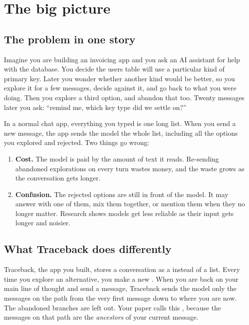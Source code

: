 \chapter{The big picture}

\section{The problem in one story}

Imagine you are building an invoicing app and you ask an AI assistant for help with the database. You decide the users table will use a particular kind of primary key. Later you wonder whether another kind would be better, so you explore it for a few messages, decide against it, and go back to what you were doing. Then you explore a third option, and abandon that too. Twenty messages later you ask: ``remind me, which key type did we settle on?''

In a normal chat app, everything you typed is one long list. When you send a new message, the app sends the model the whole list, including all the options you explored and rejected. Two things go wrong:

\begin{enumerate}
\item \textbf{Cost.} The model is paid by the amount of text it reads. Re-sending abandoned explorations on every turn wastes money, and the waste grows as the conversation gets longer.
\item \textbf{Confusion.} The rejected options are still in front of the model. It may answer with one of them, mix them together, or mention them when they no longer matter. Research shows models get less reliable as their input gets longer and noisier.
\end{enumerate}

\section{What Traceback does differently}

Traceback, the app you built, stores a conversation as a  instead of a list. Every time you explore an alternative, you make a new . When you are back on your main line of thought and send a message, Traceback sends the model only the messages on the path from the very first message down to where you are now. The abandoned branches are left out. Your paper calls this , because the messages on that path are the \emph{ancestors} of your current message.

